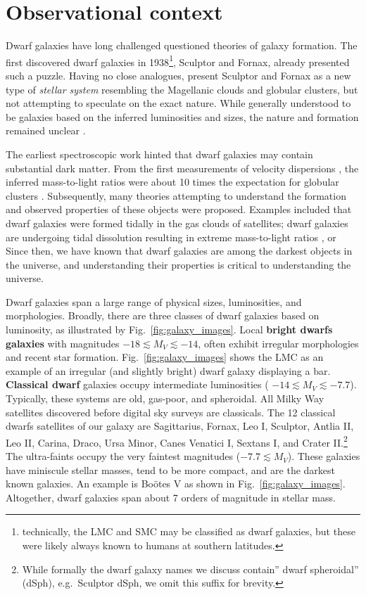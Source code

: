 \section{Observational context}\label{observational-context}

Dwarf galaxies have long challenged questioned theories of galaxy
formation. The first discovered dwarf galaxies in 1938\footnote{technically,
  the LMC and SMC may be classified as dwarf galaxies, but these were
  likely always known to humans at southern latitudes.}, Sculptor and
Fornax, already presented such a puzzle. Having no close analogues,
\citet{shapley1938} present Sculptor and Fornax as a new type of
\emph{stellar system} resembling the Magellanic clouds and globular
clusters, but not attempting to speculate on the exact nature. While
generally understood to be galaxies based on the inferred luminosities
and sizes, the nature and formation remained unclear
\citep[e.g.,][]{hodge1971}.

The earliest spectroscopic work hinted that dwarf galaxies may contain
substantial dark matter. From the first measurements of velocity
dispersions
\citep[e.g.,][]{aaronson1983, gallagher+wyse1994, pryor1996}, the
inferred mass-to-light ratios were about 10 times the expectation for
globular clusters \citep{matteo1998}. Subsequently, many theories
attempting to understand the formation and observed properties of these
objects were proposed. Examples included that dwarf galaxies were formed
tidally in the gas clouds of satellites; dwarf galaxies are undergoing
tidal dissolution resulting in extreme mass-to-light ratios
\citep[e.g.,][]{pryor1996}, or Since then, we have known that dwarf
galaxies are among the darkest objects in the universe, and
understanding their properties is critical to understanding the
universe.

Dwarf galaxies span a large range of physical sizes, luminosities, and
morphologies. Broadly, there are three classes of dwarf galaxies based
on luminosity, as illustrated by Fig.~\ref{fig:galaxy_images}. Local
\textbf{bright dwarfs galaxies} with magnitudes
\(-18 \lesssim M_V \lesssim  -14\), often exhibit irregular morphologies
and recent star formation. Fig.~\ref{fig:galaxy_images} shows the LMC as
an example of an irregular (and slightly bright) dwarf galaxy displaying
a bar. \textbf{Classical dwarf} galaxies occupy intermediate
luminosities ( \(-14 \lesssim M_V  \lesssim -7.7\)). Typically, these
systems are old, gas-poor, and spheroidal. All Milky Way satellites
discovered before digital sky surveys are classicals. The 12 classical
dwarfs satellites of our galaxy are Sagittarius, Fornax, Leo I,
Sculptor, Antlia II, Leo II, Carina, Draco, Ursa Minor, Canes Venatici
I, Sextans I, and Crater II.\footnote{While formally the dwarf galaxy
  names we discuss contain'' dwarf spheroidal'' (dSph), e.g.~Sculptor
  dSph, we omit this suffix for brevity.} The ultra-faints occupy the
very faintest magnitudes (\(-7.7 \lesssim M_V\)). These galaxies have
miniscule stellar masses, tend to be more compact, and are the darkest
known galaxies. An example is Boötes V as shown in
Fig.~\ref{fig:galaxy_images}. Altogether, dwarf galaxies span about 7
orders of magnitude in stellar mass.

